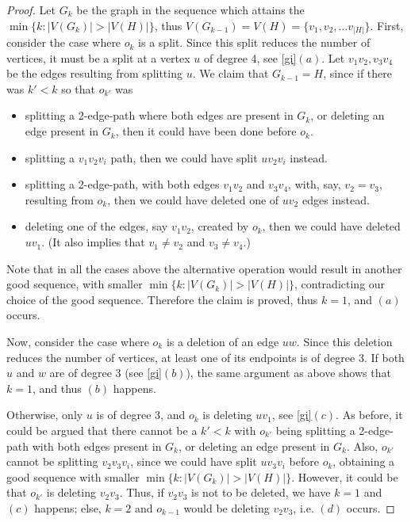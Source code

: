 \documentclass[letterpaper,11pt]{article}
\theoremstyle{definition}
\begin{document}
\begin{proof}
Let $G_k$ be the graph in the sequence which attains the $\min \{ k: |V(G_k)|>|V(H)| \}$, thus $V(G_{k-1})=V(H)=\{ v_1, v_2, \ldots v_{|H|} \}$. First, consider the case where $o_k$ is a split. Since this split reduces the number of vertices, it must be a split at a vertex $u$ of degree 4, see \cref{gi}$(a)$. Let $v_1v_2, v_3v_4$ be the edges resulting from splitting $u$. We claim that $G_{k-1}=H$, since if there was $k'<k$ so that $o_{k'}$ was
\begin{itemize}
\item splitting a 2-edge-path where both edges are present in $G_k$, or deleting an edge present in $G_k$, then it could have been done before $o_k$.
\item splitting a $v_1v_2v_i$ path, then we could have split $uv_2v_i$ instead.
\item splitting a 2-edge-path, with both edges $v_1v_2$ and $v_3v_4$, with, say, $v_2=v_3$, resulting from $o_k$, then we could have deleted one of $uv_2$ edges instead.
\item deleting one of the edges, say $v_1v_2$, created by $o_k$, then we could have deleted $uv_1$. (It also implies that $v_1\neq v_2$ and $v_3 \neq v_4$.)
\end{itemize}
Note that in all the cases above the alternative operation would result in another good sequence, with smaller $\min \{ k: |V(G_k)|>|V(H)| \}$, contradicting our choice of the good sequence. Therefore the claim is proved, thus $k=1$, and $(a)$ occurs.

Now, consider the case where $o_k$ is a deletion of an edge $uw$. Since this deletion reduces the number of vertices, at least one of its endpoints is of degree 3. If both $u$ and $w$ are of degree 3 (see \cref{gi}$(b)$), the same argument as above shows that $k=1$, and thus $(b)$ happens.

Otherwise, only $u$ is of degree 3, and $o_k$ is deleting $uv_1$, see \cref{gi}$(c)$. As before, it could be argued that there cannot be a $k'<k$ with $o_{k'}$ being splitting a 2-edge-path with both edges present in $G_k$, or deleting an edge present in $G_k$. Also, $o_{k'}$ cannot be splitting $v_2v_3v_i$, since we could have split $uv_3v_i$ before $o_k$, obtaining a good sequence with smaller $\min \{ k: |V(G_k)|>|V(H)| \}$. However, it could be that $o_{k'}$ is deleting $v_2v_3$. Thus, if $v_2v_3$ is not to be deleted, we have $k=1$ and $(c)$ happens; else, $k=2$ and $o_{k-1}$ would be deleting $v_2v_3$, i.e. $(d)$ occurs.
\end{proof}
\end{document}
